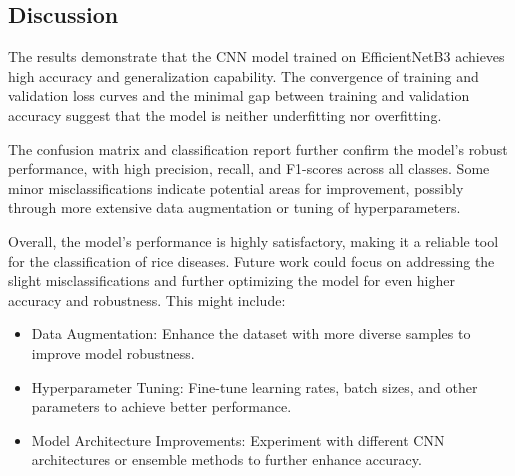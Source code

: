 \documentclass[conference]{IEEEtran}
\begin{document}
\subsection{Discussion}
The results demonstrate that the CNN model trained on EfficientNetB3 achieves high accuracy and generalization capability. The convergence of training and validation loss curves and the minimal gap between training and validation accuracy suggest that the model is neither underfitting nor overfitting.

The confusion matrix and classification report further confirm the model's robust performance, with high precision, recall, and F1-scores across all classes. Some minor misclassifications indicate potential areas for improvement, possibly through more extensive data augmentation or tuning of hyperparameters.

Overall, the model's performance is highly satisfactory, making it a reliable tool for the classification of rice diseases. Future work could focus on addressing the slight misclassifications and further optimizing the model for even higher accuracy and robustness. This might include:

\begin{itemize}
    \item Data Augmentation: Enhance the dataset with more diverse samples to improve model robustness.
    \item Hyperparameter Tuning: Fine-tune learning rates, batch sizes, and other parameters to achieve better performance.
    \item Model Architecture Improvements: Experiment with different CNN architectures or ensemble methods to further enhance accuracy.
\end{itemize}
\end{document}
